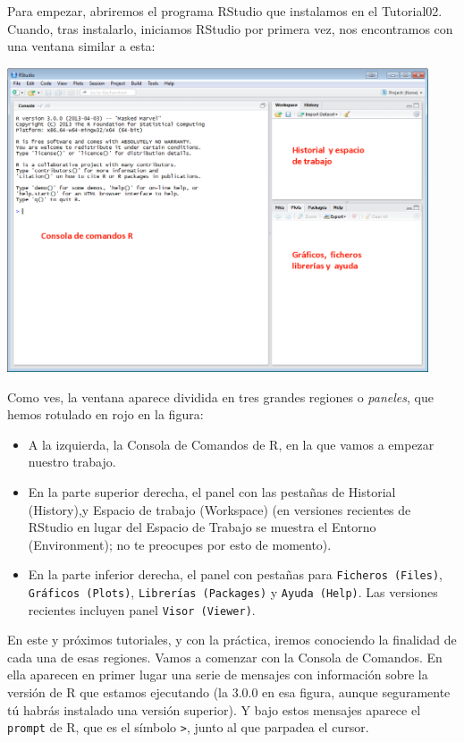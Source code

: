 \documentclass[10pt,a4paper]{article}\usepackage[]{graphicx}\usepackage[]{color}
\newcounter {cont01}
\begin{document}
Para empezar, abriremos el programa RStudio que instalamos en el Tutorial02. Cuando, tras instalarlo, iniciamos RStudio por primera vez, nos encontramos con una ventana similar a esta:
    \begin{center}
    \includegraphics[height=9cm]{../fig/Tut02-01.png}
    \end{center}
Como ves, la ventana aparece dividida en tres grandes regiones o {\em paneles}, que hemos rotulado en rojo en la figura:
\begin{itemize}
  \item A la izquierda, la {\sf Consola de Comandos de R}, en la que vamos a empezar nuestro trabajo.
  \item En la parte superior derecha, el panel con las pestañas de {\sf Historial (History)},y {\sf Espacio de trabajo (Workspace)} (en versiones recientes de RStudio en lugar del {\sf Espacio de Trabajo} se muestra el {\sf Entorno (Environment)}; no te preocupes por esto de momento).
  \item En la parte inferior derecha, el panel con pestañas para {\tt Ficheros (Files)}, {\tt Gráficos (Plots)}, {\tt Librerías (Packages)} y {\tt Ayuda (Help)}. Las versiones recientes incluyen panel {\tt Visor (Viewer)}.
\end{itemize}
En este y próximos tutoriales, y con la práctica, iremos conociendo la finalidad de cada una de esas regiones. Vamos a comenzar con la {Consola de Comandos}. En ella aparecen en primer lugar una serie de mensajes con información sobre la versión de R que estamos ejecutando (la 3.0.0 en esa figura, aunque seguramente tú habrás instalado una versión superior). Y bajo estos mensajes aparece el {\tt prompt} de R, que es el símbolo {\tt >}, junto al que parpadea el cursor.\\
\end{document}
